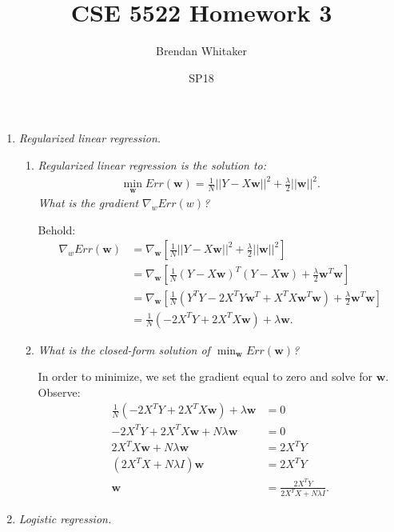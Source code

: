 \documentclass[12pt,oneside,reqno]{amsart}
\theoremstyle{plain}
\theoremstyle{definition}
\theoremstyle{remark}
\newcommand{\vecc}{\mathbf}
\newcommand{\bee}{\begin{equation}\begin{aligned}}
\newcommand{\eee}{\end{aligned}\end{equation}}
\newcommand{\fracc}{\frac}
\newcommand{\lpar}{\left(}
\newcommand{\rpar}{\right)}
\begin{document}
\title{CSE 5522 Homework 3}
\date{SP18}
\author[Brendan Whitaker]{Brendan Whitaker}
\maketitle



\begin{enumerate}[label=\arabic*.]

\item \textit{Regularized linear regression. }

\begin{enumerate}
\item \textit{Regularized linear regression is the solution to:
\bee
\min_{\vecc{w}}Err(\vecc{w}) = \fracc{1}{N}||Y - X\vecc{w}||^2 + \fracc{\lambda}{2}||\vecc{w}||^2.
\eee
What is the gradient $\nabla_wErr(w)$?}

Behold:
\bee
\nabla_wErr(\vecc{w}) &= \nabla_{\vecc{w}} \left[\fracc{1}{N}||Y - X\vecc{w}||^2 + \fracc{\lambda}{2}||\vecc{w}||^2\right]\\
&= \nabla_{\vecc{w}} \left[
\fracc{1}{N}(Y - X\vecc{w})^T(Y - X\vecc{w}) + \fracc{\lambda}{2}\vecc{w}^T\vecc{w}
\right]\\
&= \nabla_{\vecc{w}} \left[
\fracc{1}{N}\lpar Y^TY - 2X^TY\vecc{w}^T + X^TX\vecc{w}^T\vecc{w} \rpar  + \fracc{\lambda}{2}\vecc{w}^T\vecc{w}
\right]\\
&= \fracc{1}{N}\left(
-2X^TY + 2X^TX\vecc{w}
\right) + \lambda\vecc{w}.
\eee


\item \textit{What is the closed-form solution of $\min_\vecc{w}Err(\vecc{w})$?}

In order to minimize, we set the gradient equal to zero and solve for $\vecc{w}$. Observe:
\bee
\fracc{1}{N}\left(
-2X^TY + 2X^TX\vecc{w}
\right) + \lambda\vecc{w} &= 0\\
-2X^TY + 2X^TX\vecc{w} + N\lambda \vecc{w} &= 0\\
 2X^TX\vecc{w} + N\lambda \vecc{w} &= 2X^TY\\
  (2X^TX + N\lambda I) \vecc{w} &= 2X^TY\\
  \vecc{w} &= \fracc{2X^TY}{2X^TX + N\lambda I}.
\eee

\end{enumerate}

\item \textit{Logistic regression. }



\begin{enumerate}


\end{enumerate}
\end{enumerate}
\end{document}
